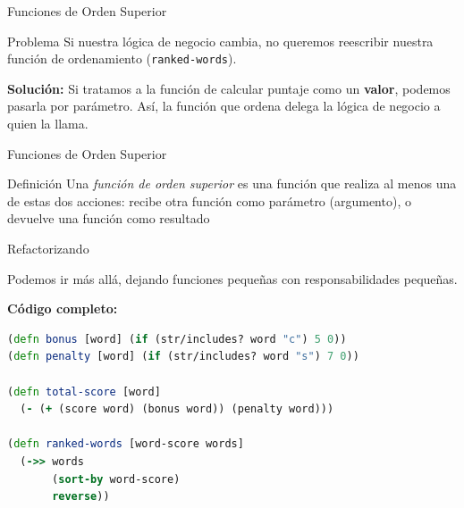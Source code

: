 \documentclass{beamer}
\begin{document}
\begin{frame}{Funciones de Orden Superior}
    
    \begin{block}{Problema}
        Si nuestra lógica de negocio cambia, no queremos reescribir nuestra función de ordenamiento (\texttt{ranked-words}).
    \end{block}
    
    
    \vspace{0.3cm}
    \textbf{Solución:} Si tratamos a la función de calcular puntaje como un \textbf{valor}, podemos pasarla por parámetro. Así, la función que ordena delega la lógica de negocio a quien la llama.
    
    \vspace{0.3cm}
    \begin{center}
    \end{center}
\end{frame}

\begin{frame}{Funciones de Orden Superior}
    
    \begin{block}{Definición}
        Una \textit{función de orden superior} es una función que realiza al menos una de estas dos acciones: recibe otra función como parámetro (argumento), o devuelve una función como resultado
    \end{block}
    
\end{frame}


\begin{frame}[fragile]{Refactorizando}

    Podemos ir más allá, dejando funciones pequeñas con responsabilidades pequeñas.

    \vspace{0.5cm}
    
    \textbf{Código completo:}

    \begin{lstlisting}[language=Clojure]
(defn bonus [word] (if (str/includes? word "c") 5 0))
(defn penalty [word] (if (str/includes? word "s") 7 0))

(defn total-score [word]
  (- (+ (score word) (bonus word)) (penalty word)))

(defn ranked-words [word-score words]
  (->> words
       (sort-by word-score)
       reverse))
    \end{lstlisting}
\end{frame}
\end{document}
